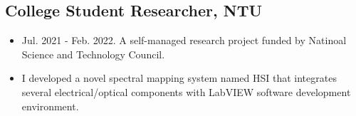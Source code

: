 \documentclass[12pt]{article}
\begin{document}
        \subsection*{College Student Researcher, NTU}
        {\sffamily
        
        \begin{itemize}
            \item Jul. 2021 - Feb. 2022. A self-managed research project funded by Natinoal Science and Technology Council.
            \item I developed a novel spectral mapping system named HSI that integrates several electrical/optical components with LabVIEW software development environment. %
        \end{itemize}}
\end{document}
